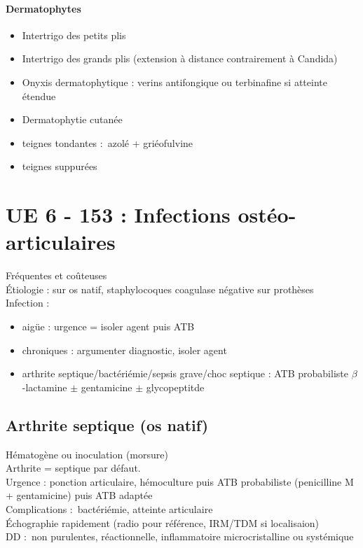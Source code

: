 \paragraph{Dermatophytes}
\begin{itemize}
  \item Intertrigo des petits plis
  \item Intertrigo des grands plis (extension à distance contrairement à Candida)
  \item Onyxis dermatophytique : verins antifongique ou terbinafine si atteinte
    étendue
  \item Dermatophytie cutanée
  \item teignes tondantes : azolé + griéofulvine
  \item teignes suppurées
\end{itemize}

\section{UE 6 - 153 : Infections ostéo-articulaires}%
\label{sec:ue_6_153_infections_osteo_articulaires}
Fréquentes et coûteuses\\
Étiologie :  sur os natif, staphylocoques coagulase négative sur
prothèses\\
Infection :
\begin{itemize}
  \item aigüe : \danger urgence = isoler agent puis ATB
  \item chroniques : argumenter diagnostic, isoler agent
    \item arthrite septique/bactériémie/sepsis grave/choc septique : ATB
      probabiliste $\beta$-lactamine $\pm$ gentamicine $\pm$ glycopeptitde
\end{itemize}

\subsection{Arthrite septique (os natif)}
Hématogène ou inoculation (morsure)\\
Arthrite = septique par défaut. \\
Urgence \skull : ponction articulaire, hémoculture puis ATB probabiliste
(penicilline M + gentamicine) puis ATB adaptée\\
Complications : bactériémie, atteinte articulaire\\
Échographie rapidement (radio pour référence, IRM/TDM si localisaion)\\
DD : non purulentes, réactionnelle, inflammatoire microcristalline ou systémique

